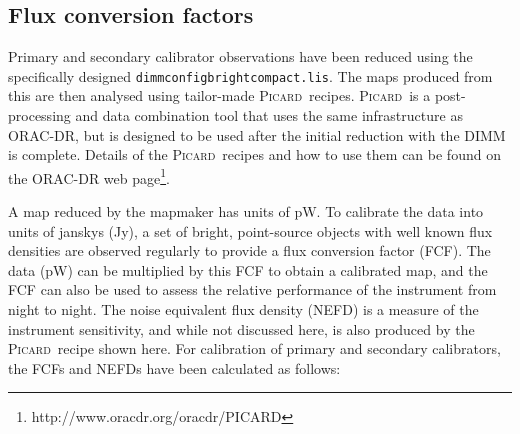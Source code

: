 \documentclass[twoside,11pt]{article}
\newcommand{\htmladdnormallinkfoot}[2]{#1\footnote{#2}}
\newcommand{\xref}[3]{#1}
\renewcommand{\_}{\texttt{\symbol{95}}}
\newcommand{\picard}{\xref{\textsc{Picard}}{sun231}{}}
\begin{document}
\subsection{Flux conversion factors}
\label{sec:fcf}

Primary and secondary calibrator observations have been reduced using
the specifically designed
\texttt{dimmconfig\_bright\_compact.lis}. The maps produced from this
are then analysed using tailor-made \picard\ recipes. \picard\ is a
post-processing and data combination tool that uses the same
infrastructure as ORAC-DR, but is designed to be used after the
initial reduction with the DIMM is complete. Details of the \picard\
recipes and how to use them can be found on \htmladdnormallinkfoot{the
  ORAC-DR web page}{http://www.oracdr.org/oracdr/PICARD}.

A map reduced by the mapmaker has units of pW. To calibrate the data
into units of janskys (Jy), a set of bright, point-source objects with
well known flux densities are observed regularly to provide a flux
conversion factor (FCF). The data (pW) can be multiplied by this FCF
to obtain a calibrated map, and the FCF can also be used to assess the
relative performance of the instrument from night to night. The noise
equivalent flux density (NEFD) is a measure of the instrument
sensitivity, and while not discussed here, is also produced by the
\picard\ recipe shown here. For calibration of primary and secondary
calibrators, the FCFs and NEFDs have been calculated as follows:
\end{document}
